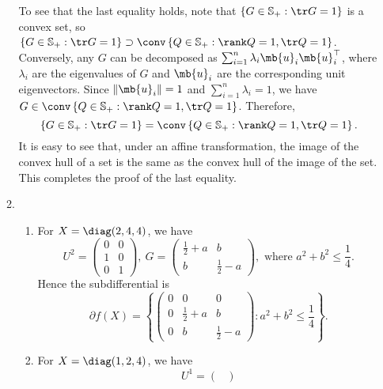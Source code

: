 \begin{exercise}
\begin{enumerate}
\begin{solution}
\begin{enumerate}
            To see that the last equality holds, note that $\left\{G\in \mathbb{S}_+ : \tr G = 1\right\}$ is a convex set, so $\left\{G\in \mathbb{S}_+ : \tr G = 1\right\} \supset \conv \left\{Q\in \mathbb{S}_+ : \rank Q = 1,\tr Q = 1\right\}$. Conversely, any $G$ can be decomposed as $\sum_{i=1}^n \lambda_i \mb{u}_i \mb{u}_i^\top$, where $\lambda_i$ are the eigenvalues of $G$ and $\mb{u}_i$ are the corresponding unit eigenvectors. Since $\|\mb{u}_i\| = 1$ and $\sum_{i=1}^n \lambda_i = 1$, we have $G\in \conv \left\{Q\in \mathbb{S}_+ : \rank Q = 1,\tr Q = 1\right\}$. Therefore,
            $$
              \left\{G\in \mathbb{S}_+ : \tr G = 1\right\}
              = \conv \left\{Q\in \mathbb{S}_+ : \rank Q = 1,\tr Q = 1\right\}.
            $$
            It is easy to see that, under an affine transformation, the image of the convex hull of a set is the same as the convex hull of the image of the set. This completes the proof of the last equality.
          \item \begin{enumerate}
              \item For $X = \diag (2,4,4)$, we have
                $$ U^2 =
                  \begin{pmatrix}
                    0 & 0  \\
                    1 & 0  \\  
                    0 & 1
                  \end{pmatrix},\ G = 
                  \begin{pmatrix}
                    \frac{1}{2} + a & b                \\
                    b               & \frac{1}{2} - a
                  \end{pmatrix}, \text{ where } a^2 + b^2 \le \frac{1}{4}.
                $$
                Hence the subdifferential is
                $$
                  \partial f(X) = \left\{
                  \begin{pmatrix}
                    0 & 0               & 0                \\
                    0 & \frac{1}{2} + a & b                \\
                    0 & b               & \frac{1}{2} - a
                  \end{pmatrix}: a^2 + b^2 \le \frac{1}{4}\right\}.
                $$
              \item For $X = \diag (1,2,4)$, we have
                $$ U^1 =
                  \begin{pmatrix}

\end{pmatrix}$$
\end{enumerate}
\end{enumerate}
\end{solution}
\end{enumerate}
\end{exercise}
